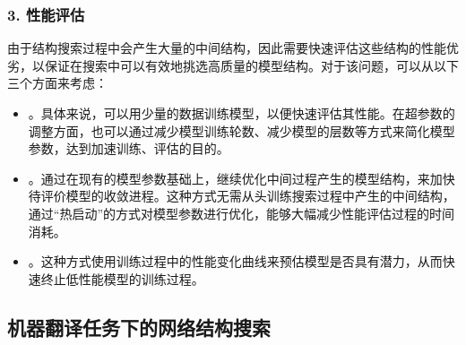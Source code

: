 
\subsubsection{3. 性能评估}\label{subsubsec-15.4.2.3}

\parinterval 由于结构搜索过程中会产生大量的中间结构，因此需要快速评估这些结构的性能优劣，以保证在搜索中可以有效地挑选高质量的模型结构。对于该问题，可以从以下三个方面来考虑：

\begin{itemize}
\vspace{0.5em}
\item {\small{}}。具体来说，可以用少量的数据训练模型，以便快速评估其性能。在超参数的调整方面，也可以通过减少模型训练轮数、减少模型的层数等方式来简化模型参数，达到加速训练、评估的目的。
\vspace{0.5em}
\item {\small{}}。通过在现有的模型参数基础上，继续优化中间过程产生的模型结构，来加快待评价模型的收敛进程。这种方式无需从头训练搜索过程中产生的中间结构，通过“热启动”的方式对模型参数进行优化，能够大幅减少性能评估过程的时间消耗。
\vspace{0.5em}
\item {\small{}}。这种方式使用训练过程中的性能变化曲线来预估模型是否具有潜力，从而快速终止低性能模型的训练过程。
\vspace{0.5em}
\end{itemize}


\subsection{机器翻译任务下的网络结构搜索}

